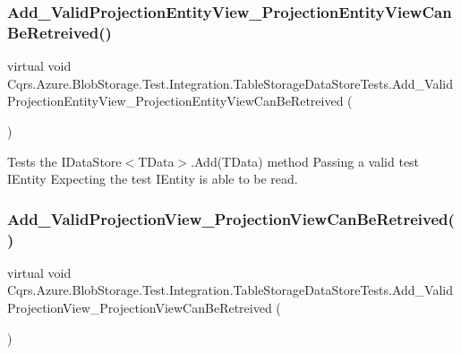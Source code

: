\subsubsection{\texorpdfstring{Add\+\_\+\+Valid\+Projection\+Entity\+View\+\_\+\+Projection\+Entity\+View\+Can\+Be\+Retreived()}{Add\_ValidProjectionEntityView\_ProjectionEntityViewCanBeRetreived()}}
{\footnotesize\ttfamily virtual void Cqrs.\+Azure.\+Blob\+Storage.\+Test.\+Integration.\+Table\+Storage\+Data\+Store\+Tests.\+Add\+\_\+\+Valid\+Projection\+Entity\+View\+\_\+\+Projection\+Entity\+View\+Can\+Be\+Retreived (\begin{DoxyParamCaption}{ }\end{DoxyParamCaption})\hspace{0.3cm}{\ttfamily [virtual]}}



Tests the I\+Data\+Store$<$\+T\+Data$>$.\+Add(\+T\+Data) method Passing a valid test I\+Entity Expecting the test I\+Entity is able to be read. 

\mbox{\label{classCqrs_1_1Azure_1_1BlobStorage_1_1Test_1_1Integration_1_1TableStorageDataStoreTests_a4d5cbb9f8690e2eff9529966e6816b5c_a4d5cbb9f8690e2eff9529966e6816b5c}} 
\subsubsection{\texorpdfstring{Add\+\_\+\+Valid\+Projection\+View\+\_\+\+Projection\+View\+Can\+Be\+Retreived()}{Add\_ValidProjectionView\_ProjectionViewCanBeRetreived()}}
{\footnotesize\ttfamily virtual void Cqrs.\+Azure.\+Blob\+Storage.\+Test.\+Integration.\+Table\+Storage\+Data\+Store\+Tests.\+Add\+\_\+\+Valid\+Projection\+View\+\_\+\+Projection\+View\+Can\+Be\+Retreived (\begin{DoxyParamCaption}{ }\end{DoxyParamCaption})\hspace{0.3cm}{\ttfamily [virtual]}}



